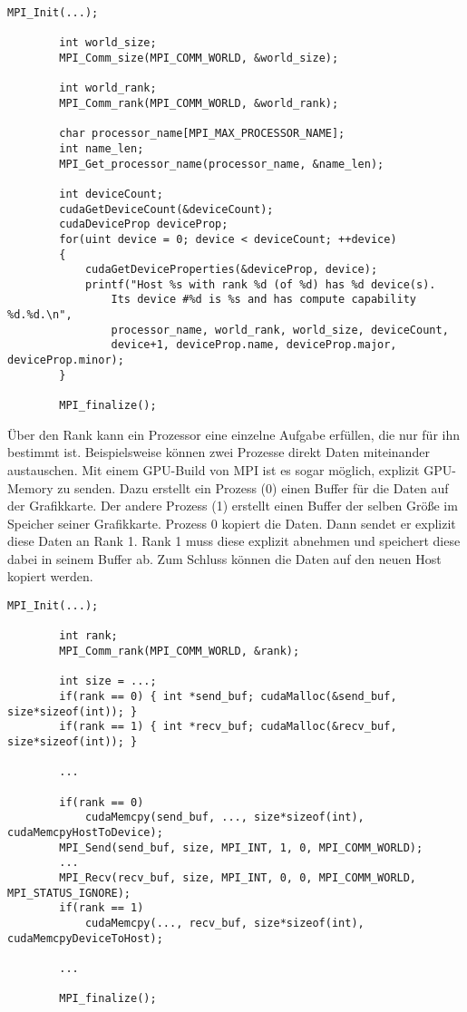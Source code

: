 		\newpage
		
		\begin{lstlisting}[caption=Device Abfrage mit MPI]
		MPI_Init(...);
   
		int world_size;
		MPI_Comm_size(MPI_COMM_WORLD, &world_size);

		int world_rank;
		MPI_Comm_rank(MPI_COMM_WORLD, &world_rank);

		char processor_name[MPI_MAX_PROCESSOR_NAME];
		int name_len;
		MPI_Get_processor_name(processor_name, &name_len);

		int deviceCount;
		cudaGetDeviceCount(&deviceCount);
		cudaDeviceProp deviceProp;
		for(uint device = 0; device < deviceCount; ++device)
		{
			cudaGetDeviceProperties(&deviceProp, device);
			printf("Host %s with rank %d (of %d) has %d device(s). 
				Its device #%d is %s and has compute capability %d.%d.\n", 
				processor_name, world_rank, world_size, deviceCount, 
				device+1, deviceProp.name, deviceProp.major, deviceProp.minor);
		}
    
		MPI_finalize();
	    \end{lstlisting}
    
    	Über den Rank kann ein Prozessor eine einzelne Aufgabe erfüllen, die nur für ihn bestimmt ist. Beispielsweise können zwei Prozesse direkt Daten miteinander austauschen. Mit einem GPU-Build von MPI ist es sogar möglich, explizit GPU-Memory zu senden. Dazu erstellt ein Prozess (0) einen Buffer für die Daten auf der Grafikkarte. Der andere Prozess (1) erstellt einen Buffer der selben Größe im Speicher seiner Grafikkarte. Prozess 0 kopiert die Daten. Dann sendet er explizit diese Daten an Rank 1. Rank 1 muss diese explizit abnehmen und speichert diese dabei in seinem Buffer ab. Zum Schluss können die Daten auf den neuen Host kopiert werden.
    	
    	\newpage
    	
	    \begin{lstlisting}[caption=Austausch von Device Memory mit MPI] 
    	MPI_Init(...);
    
    	int rank;   
	    MPI_Comm_rank(MPI_COMM_WORLD, &rank);
    
    	int size = ...;
	    if(rank == 0) { int *send_buf; cudaMalloc(&send_buf, size*sizeof(int)); }
    	if(rank == 1) { int *recv_buf; cudaMalloc(&recv_buf, size*sizeof(int)); }
    
    	...
    
    	if(rank == 0) 
    		cudaMemcpy(send_buf, ..., size*sizeof(int), cudaMemcpyHostToDevice);   
	    MPI_Send(send_buf, size, MPI_INT, 1, 0, MPI_COMM_WORLD);
	    ...
    	MPI_Recv(recv_buf, size, MPI_INT, 0, 0, MPI_COMM_WORLD, MPI_STATUS_IGNORE);
    	if(rank == 1) 
    		cudaMemcpy(..., recv_buf, size*sizeof(int), cudaMemcpyDeviceToHost);
    		
    	...
    
	    MPI_finalize();
    	\end{lstlisting}
    	
